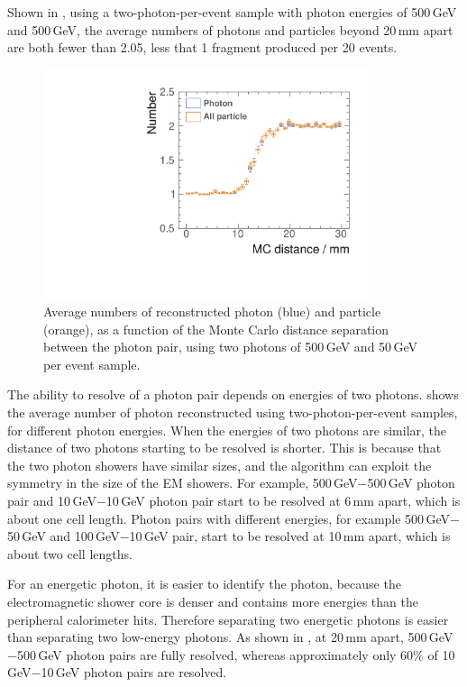 Shown in , using a two-photon-per-event sample with photon energies of  500\,GeV and 500\,GeV, the average numbers of photons and particles beyond 20\,mm apart are both fewer than 2.05, less that 1 fragment produced per 20 events.



\begin{figure}[tbph]
\centering
        \includegraphics[width=0.85\textwidth]{photon/DoubleN_pN_all.pdf}
        \caption{Average numbers of reconstructed photon  (blue) and particle (orange), as a function of the Monte Carlo distance separation between the photon pair, using two photons of 500\,GeV and 50\,GeV per event sample. }
        \label{fig:photonDoubleCompareN_pN_all}
\end{figure}

The ability to  resolve of a photon pair depends on energies of two photons.  shows the average number of photon reconstructed using two-photon-per-event samples, for different photon energies. When the energies of two photons are similar, the distance of two photons starting to be resolved is shorter. This is because that the two photon showers have similar sizes, and the \peakFinding algorithm can exploit the symmetry in the size of the EM showers. For example, 500\,GeV$-$500\,GeV photon pair and 10\,GeV$-$10\,GeV photon pair start to be resolved at 6\,mm apart, which is about one \ECAL cell length. Photon pairs with different energies, for example 500\,GeV$-$50\,GeV and  100\,GeV$-$10\,GeV pair, start to be resolved at 10\,mm apart, which is about two \ECAL cell lengths.

For an energetic photon, it is easier to identify the photon, because the electromagnetic shower core is denser and contains more energies than the peripheral calorimeter hits. Therefore separating two energetic photons is easier than separating two low-energy photons. As shown in , at 20\,mm apart, 500\,GeV$-$500\,GeV photon pairs are fully resolved, whereas approximately only 60\% of 10\,GeV$-$10\,GeV photon pairs are resolved.

